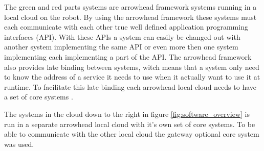 \documentclass{article}
\begin{document}
The green and red parts systems are arrowhead framework systems \cite{delsing2017arrowhead} running in a local cloud on the robot. By using the arrowhead framework these systems must each communicate with each other true well defined application programming interfaces (API). With these APIs a system can easily be changed out with another system implementing the same API or even more then one system implementing each implementing a part of the API.
The arrowhead framework also provides late binding between systems, witch means that a system only need to know the address of a service it needs to use when it actually want to use it at runtime.
To facilitate this late binding each arrowhead local cloud needs to have a set of core systems \cite{varga2017making}.

The systems in the cloud down to the right in figure \ref{fig:software_overview} is run in a separate arrowhead local cloud with it's own set of core systems. To be able to communicate with the other local cloud the gateway optional core system \cite{varga2015service} was used.
\end{document}

